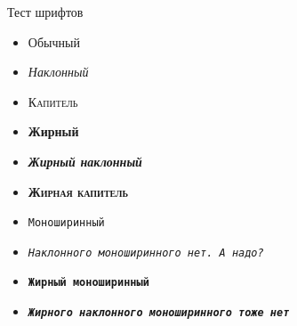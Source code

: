 \documentclass[12pt]{beamer}
\begin{document}
\begin{frame}{Тест шрифтов}
  \begin{itemize}
    \item Обычный
    \item \textit{Наклонный}
    \item \textsc{Капитель}
    \item \textbf{Жирный}
    \item \textbf{\textit{Жирный наклонный}}
    \item \textbf{\textsc{Жирная капитель}}
    \item \texttt{Моноширинный}
    \item \texttt{\textit{Наклонного моноширинного нет. А надо?}}
    \item \texttt{\textbf{Жирный моноширинный}}
    \item \texttt{\textbf{\textit{Жирного наклонного моноширинного тоже нет}}}
  \end{itemize}
\end{frame}
\end{document}
